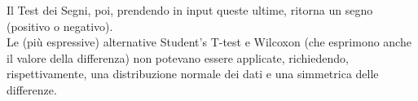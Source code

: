 %
%
%
%
%
%



Il Test dei Segni, poi, prendendo in input queste ultime, ritorna un segno
(positivo o negativo).\\
Le (più espressive) alternative Student's T-test e Wilcoxon (che esprimono anche
il valore della differenza) non potevano essere applicate, richiedendo,
rispettivamente, una distribuzione normale dei dati e una simmetrica delle
differenze.



